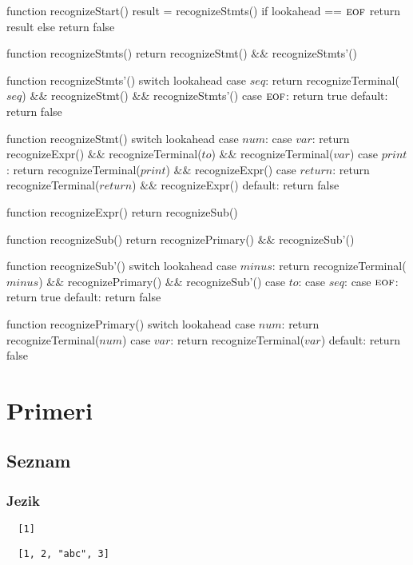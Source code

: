 \documentclass{report}
\newcommand{\EOF}{\textsc{eof}}
\newcommand{\T}[1]{{#1}}
\begin{document}
\begin{algorithm}
  function recognizeStart()
    result = recognizeStmts()
    if lookahead == $\EOF$
      return result
    else
      return false

  function recognizeStmts()
    return recognizeStmt() $\&\&$ recognizeStmts'()

  function recognizeStmts'()
    switch lookahead
      case $\T{seq}$:
        return recognizeTerminal($\T{seq}$) $\&\&$ recognizeStmt() $\&\&$ recognizeStmts'()
      case $\EOF$:
        return true
      default:
        return false

  function recognizeStmt()
    switch lookahead
      case $\T{num}$:
      case $\T{var}$:
        return recognizeExpr() $\&\&$ recognizeTerminal($\T{to}$) $\&\&$ recognizeTerminal($\T{var}$)
      case $\T{print}$:
        return recognizeTerminal($\T{print}$) $\&\&$ recognizeExpr()
      case $\T{return}$:
        return recognizeTerminal($\T{return}$) $\&\&$ recognizeExpr()
      default:
        return false

  function recognizeExpr()
    return recognizeSub()

  function recognizeSub()
    return recognizePrimary() $\&\&$ recognizeSub'()

  function recognizeSub'()
    switch lookahead
      case $\T{minus}$:
        return recognizeTerminal($\T{minus}$) $\&\&$ recognizePrimary() $\&\&$ recognizeSub'()
      case $\T{to}$:
      case $\T{seq}$:
      case $\EOF$:
       return true
      default:
        return false

  function recognizePrimary()
    switch lookahead
      case $\T{num}$:
        return recognizeTerminal($\T{num}$)
      case $\T{var}$:
        return recognizeTerminal($\T{var}$)
      default:
        return false
\end{algorithm}


\section*{Primeri}

\subsection{Seznam}

\subsubsection*{Jezik}
\begin{verbatim}
  [1]
\end{verbatim}
\begin{verbatim}
  [1, 2, "abc", 3]
\end{verbatim}
\end{document}

